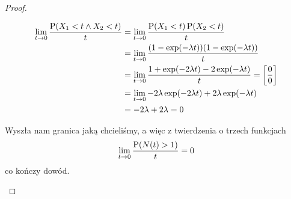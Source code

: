 \begin{proof}
\begin{enumerate}
		      \begin{align*}
			      \lim_{t \rightarrow 0} \frac{\prob(X_1 < t \land X_2 < t)}{t}
			       & = \lim_{t \rightarrow 0} \frac{\prob(X_1 < t)\prob(X_2 < t)}{t}                                       \\
			       & = \lim_{t \rightarrow 0} \frac{\pars{1 - \exp(-\lambda t)}\pars{1 - \exp(-\lambda t)}}{t}             \\
			       & = \lim_{t \rightarrow 0} \frac{1 + \exp(-2\lambda t) - 2\exp(-\lambda t)}{t} = \brackets{\frac{0}{0}} \\
			       & = \lim_{t \rightarrow 0} -2\lambda\exp(-2\lambda t) + 2\lambda\exp(-\lambda t)                        \\
			       & = -2\lambda + 2\lambda = 0
		      \end{align*}

		      Wyszła nam granica jaką chcieliśmy, a więc z twierdzenia o trzech funkcjach
		      \[
			      \lim_{t \rightarrow 0} \frac{\operatorname{P}(N(t) > 1)}{t} = 0
		      \]
		      co kończy dowód.
	\end{enumerate}
\end{proof}